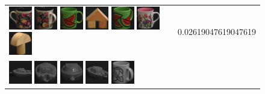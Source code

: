 \begin{figure}[tbp]
\begin{center}
\begin{tabular}{m{11cm} | m{3cm} |}
\includegraphics[width=1cm]{coil/beeld-61.eps}
\includegraphics[width=1cm]{coil/beeld-64.eps}
\includegraphics[width=1cm]{coil/beeld-30.eps}
\includegraphics[width=1cm]{coil/beeld-43.eps}
\includegraphics[width=1cm]{coil/beeld-33.eps}
\includegraphics[width=1cm]{coil/beeld-6.eps}
\includegraphics[width=1cm]{coil/beeld-3.eps}
& {\scriptsize 0.02619047619047619}
\\
\includegraphics[width=1cm]{coil/beeld-24.eps}
\includegraphics[width=1cm]{coil/beeld-26.eps}
\includegraphics[width=1cm]{coil/beeld-28.eps}
\includegraphics[width=1cm]{coil/beeld-25.eps}
\includegraphics[width=1cm]{coil/beeld-49.eps}

\end{tabular}
\end{center}
\end{figure}
